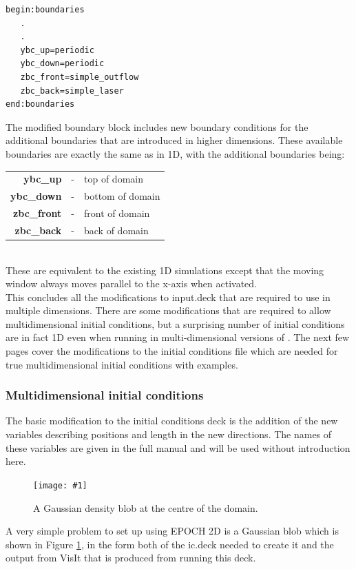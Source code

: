 \documentclass[12pt,a4paper]{article}
\newcommand{\boxverbatim}[1]{\begin{Verbatim}[obeytabs=true,frame=single,
  framerule=0.5mm,rulecolor=\color{warwickmid},formatcom=\color{black},label=#1]}
\newcommand{\inlineemph}[1]{{\color{warwicklight} \bf{#1}}}
\newcommand{\EPOCH}{{\color{warwickdark}\fontfamily{phv}\selectfont{EPOCH}}}
\newcommand{\scaledcapimage}[4]
  {{\begin{figure}[hbt!]\centering\texttt{[image: \#1]}\caption{#3}
    \label{#2} \end{figure}}}
\begin{document}
\boxverbatim{Changed boundaries block}
begin:boundaries
   .
   .
   ybc_up=periodic
   ybc_down=periodic
   zbc_front=simple_outflow
   zbc_back=simple_laser
end:boundaries
\end{Verbatim}

The modified boundary block includes new boundary conditions for the additional
boundaries that are introduced in higher dimensions. These available boundaries
are exactly the same as in 1D, with the additional boundaries being:\\

\begin{tabular}{rcl}
\inlineemph{ybc\_up}    &-& top of domain\\
\inlineemph{ybc\_down}  &-& bottom of domain\\
\inlineemph{zbc\_front} &-& front of domain\\
\inlineemph{zbc\_back}  &-& back of domain\\
\end{tabular} \\

These are equivalent to the existing 1D simulations except that the moving
window always moves parallel to the x-axis when activated.\\ This concludes all
the modifications to input.deck that are required to use {\EPOCH} in multiple
dimensions. There are some modifications that are required to allow
multidimensional initial conditions, but a surprising number of initial
conditions are in fact 1D even when running in multi-dimensional versions of
\EPOCH. The next few pages cover the modifications to the initial conditions
file which are needed for true multidimensional initial conditions with
examples.

\subsubsection{Multidimensional initial conditions}

The basic modification to the {\EPOCH} initial conditions deck is the addition of
the new variables describing positions and length in the new directions. The
names of these variables are given in the full manual and will be used without
introduction here.

\scaledcapimage{./images/gaussic}{gaussblob}{A Gaussian density blob at the
centre of the domain.}{0.4}

A very simple problem to set up using EPOCH 2D is a Gaussian blob which is
shown in Figure \ref{gaussblob}, in the form both of the ic.deck needed to
create it and the output from VisIt that is produced from running this deck.
\end{document}
